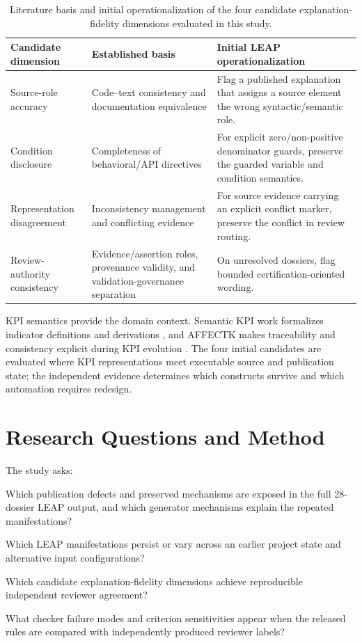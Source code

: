 \documentclass[a4paper,fleqn]{cas-dc}
\begin{document}
\begin{table}[t]
\centering
\caption{Literature basis and initial operationalization of the four candidate explanation-fidelity dimensions evaluated in this study.}
\label{tab:contract}
\begin{tabularx}{\textwidth}{@{}lYY@{}}
\toprule
Candidate dimension & Established basis & Initial LEAP operationalization \\
\midrule
Source-role accuracy & Code--text consistency and documentation equivalence \citep{Wen2019,Xu2024,Eghbali2026} & Flag a published explanation that assigns a source element the wrong syntactic/semantic role. \\
Condition disclosure & Completeness of behavioral/API directives \citep{Eghbali2026,Zhou2017} & For explicit zero/non-positive denominator guards, preserve the guarded variable and condition semantics. \\
Representation disagreement & Inconsistency management and conflicting evidence \citep{Nuseibeh2001,Brush2016} & For source evidence carrying an explicit conflict marker, preserve the conflict in review routing. \\
Review-authority consistency & Evidence/assertion roles, provenance validity, and validation-governance separation \citep{Giglio2019,W3CProvConstraints2013,Sadiq2026} & On unresolved dossiers, flag bounded certification-oriented wording. \\
\bottomrule
\end{tabularx}
\end{table}

KPI semantics provide the domain context. Semantic KPI work formalizes indicator definitions and derivations \citep{Mate2017,RoldanGarcia2021,Diamantini2025}, and AFFECTK makes traceability and consistency explicit during KPI evolution \citep{Dominguez2025}. The four initial candidates are evaluated where KPI representations meet executable source and publication state; the independent evidence determines which constructs survive and which automation requires redesign.
\section{Research Questions and Method}
The study asks:
\begin{description}[leftmargin=1.2cm,style=nextline]
\item[RQ1] Which publication defects and preserved mechanisms are exposed in the full 28-dossier LEAP output, and which generator mechanisms explain the repeated manifestations?
\item[RQ2] Which LEAP manifestations persist or vary across an earlier project state and alternative input configurations?
\item[RQ3] Which candidate explanation-fidelity dimensions achieve reproducible independent reviewer agreement?
\item[RQ4] What checker failure modes and criterion sensitivities appear when the released rules are compared with independently produced reviewer labels?
\end{description}
\end{document}
